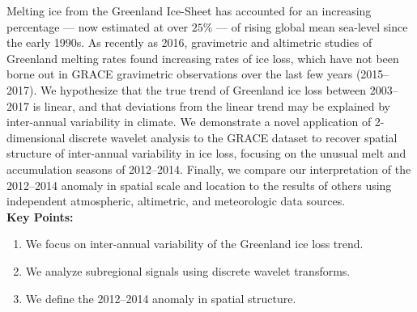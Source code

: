 

Melting ice from the Greenland Ice-Sheet has accounted for an increasing percentage --- now estimated at over $25\%$ --- of rising global mean sea-level since the early 1990s. As recently as 2016, gravimetric and altimetric studies of Greenland melting rates found  increasing rates of ice loss, which have not been borne out in GRACE gravimetric observations over the last few years (2015--2017). We hypothesize that the true trend of Greenland ice loss between 2003--2017 is linear, and that deviations from the linear trend may be explained by inter-annual variability in climate. We demonstrate a novel application of 2-dimensional discrete wavelet analysis to the GRACE dataset to recover spatial structure of inter-annual variability in ice loss, focusing on the unusual melt and accumulation seasons of 2012--2014. Finally, we compare our interpretation of the 2012--2014 anomaly in spatial scale and location to the results of others using independent atmospheric, altimetric, and meteorologic data sources. \\[3em]

\textbf{Key Points:}
\begin{enumerate}
	\item We focus on inter-annual variability of the Greenland ice loss trend.
	\item We analyze subregional signals using discrete wavelet transforms.
	\item We define the 2012--2014 anomaly in spatial structure.

\end{enumerate}